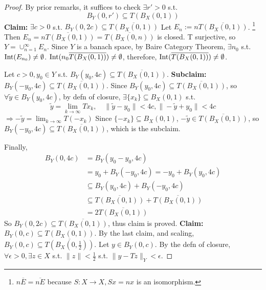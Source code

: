 \begin{proof}
    By prior remarks, it suffices to check $\exists r' > 0$ s.t. 
    \[
        B_Y(0, r') \subseteq T(B_X(0, 1))
    \]  
    \noindent \textbf{Claim:} $\exists c > 0 $ s.t. $B_Y(0, 2c) \subseteq
    \overline{T(B_X(0, 1))}$ 
    \newline \noindent Let $E_n := n \overline{T(B_X(0, 1))}$. 
    \footnote{$n\overline{E} = \overline{nE}$ because $S : X \to X, Sx = nx$ is an isomorphism.}
    Then $E_n = \overline{nT(B_X(0, 1))} = \overline{T(B_X(0, n))}$ is closed.
    T surjective, so $Y = \cup_{n = 1}^{\infty} E_n$. Since $Y$ is a banach space, by Baire
    Category Theorem, $\exists n_0$ s.t. $\operatorname{Int}(E_{n_0}) \neq \emptyset$.
    $\operatorname{Int}(n_0 \overline{T(B_X(0, 1))}) \neq \emptyset$, therefore, $\operatorname{Int}(
    \overline{T(B_X(0, 1))}) \neq \emptyset$. 
    
    Let $c > 0, y_0 \in Y$ s.t. 
    $B_Y(y_0, 4c) \subseteq \overline{T(B_X(0, 1))}$.
    \newline\noindent \textbf{Subclaim:} $B_Y(-y_0, 4c) \subseteq \overline{T(B_X(0, 1))}$.
    \newline \noindent Since $B_Y(y_0, 4c) \subseteq \overline{T(B_X(0, 1))}$, so $\forall \tilde{y}
    \in B_Y(y_0, 4c)$, by defn of closure, $\exists \{x_{k}\} \subseteq B_X(0, 1)$ s.t. 
    \[
        \tilde{y} = \lim_{k \to \infty} Tx_k, \quad \| \tilde{y} - y_0 \| < 4c, \| -\tilde{y} + y_0 \| < 4c
    \]      
    $\Rightarrow - \tilde{y} = \lim_{k \to \infty} T(-x_k)$ Since $\{-x_k\} 
    \subseteq B_X(0, 1)$, $-\tilde{y} \in \overline{T(B_X(0, 1))}$, so \\
    $B_Y(-y_0, 4c) \subseteq \overline{T(B_X(0, 1))}$, which is the subclaim.
    
    Finally, 
    \begin{align*}
        B_Y(0, 4c) &= B_Y(y_0 - y_0, 4c) \\
                   &= y_0 + B_Y(-y_0, 4c) = -y_0 + B_Y(y_0, 4c) \\
                   &\subseteq B_Y(y_0, 4c) + B_Y(-y_0, 4c) \\
                   &\subseteq \overline{T(B_X(0, 1))} + \overline{T(B_X(0, 1))} \\
                   &= 2\overline{T(B_X(0, 1))}
    \end{align*}
    So $B_Y(0, 2c) \subseteq \overline{T(B_X(0, 1))}$, thus claim is proved.
    \newline\noindent \textbf{Claim:} $B_Y(0, c) \subseteq T(B_X(0, 1))$.
    \newline\noindent By the last claim, and scaling, $B_Y(0, c) \subseteq \overline{
        T(B_X(0, \frac{1}{2}))}$. Let $y \in B_Y(0, c)$. By the defn of closure, $\forall \epsilon
        > 0, \exists z \in X$ s.t. $\| z \| < \frac{1}{2} $ s.t. $\| y - Tz \|_Y < \epsilon $.
        

\end{proof}
